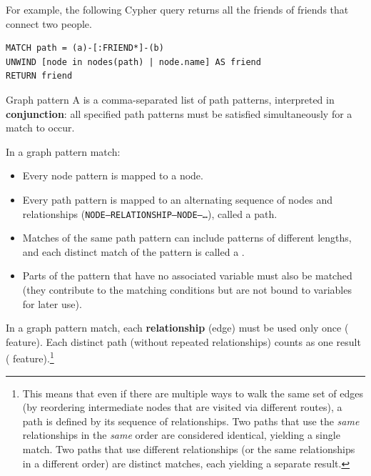 \begin{example}{}
    For example, the following Cypher query returns all the friends of friends that connect two people.
    \begin{lstlisting}
MATCH path = (a)-[:FRIEND*]-(b)
UNWIND [node in nodes(path) | node.name] AS friend
RETURN friend
    \end{lstlisting}
\end{example}

\noindent
\begin{definition}{Graph pattern}
    A  is a comma-separated list of path patterns, interpreted in \textbf{conjunction}: all specified path patterns must be satisfied simultaneously for a match to occur.
\end{definition}

\noindent
In a graph pattern match:
\begin{itemize}
    \item Every node pattern is mapped to a node.
    \item Every path pattern is mapped to an alternating sequence of nodes and relationships (\texttt{NODE--RELATIONSHIP--NODE--\dots}), called a path.
    \item Matches of the same path pattern can include patterns of different lengths, and each distinct match of the pattern is called a .
    \item Parts of the pattern that have no associated variable must also be matched (they contribute to the matching conditions but are not bound to variables for later use).
\end{itemize}

\noindent
In a graph pattern match, each \textbf{relationship} (edge) must be used only once ( feature). 
Each distinct path (without repeated relationships) counts as one result ( feature).\footnote{This means that even if there are multiple ways to walk the same set of edges (by reordering intermediate nodes that are visited via different routes), a path is defined by its sequence of relationships. Two paths that use the \emph{same} relationships in the \emph{same} order are considered identical, yielding a single match. Two paths that use different relationships (or the same relationships in a different order) are distinct matches, each yielding a separate result.}

